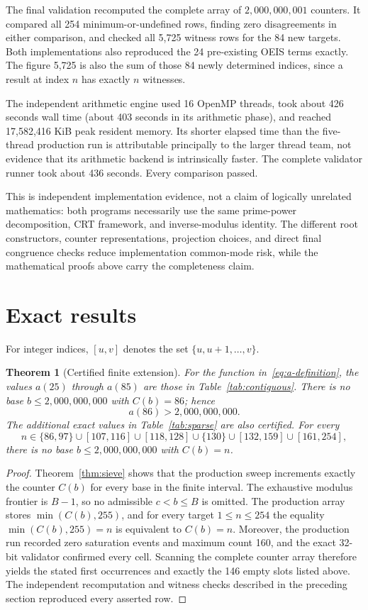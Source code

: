 \documentclass[11pt]{article}
\newtheorem{theorem}{Theorem}
\begin{document}
The final validation recomputed the complete array of
$2{,}000{,}000{,}001$ counters.  It compared all 254 minimum-or-undefined
rows, finding zero disagreements in either comparison, and checked all 5,725
witness rows for the 84 new targets.  Both implementations also reproduced
the 24 pre-existing OEIS terms exactly.
The figure 5,725 is also the sum of those 84 newly determined indices, since
a result at index $n$ has exactly $n$ witnesses.

The independent arithmetic engine used 16 OpenMP threads, took about 426 seconds wall time (about 403 seconds in its arithmetic phase), and reached 17,582,416 KiB peak resident memory.  Its shorter elapsed time than the five-thread production run is attributable principally to the larger thread team, not evidence that its arithmetic backend is intrinsically faster.
The complete validator runner took about 436 seconds.  Every comparison passed.

This is independent implementation evidence, not a claim of logically
unrelated mathematics: both programs necessarily use the same prime-power
decomposition, CRT framework, and inverse-modulus identity.  The different
root constructors, counter representations, projection choices, and direct
final congruence checks reduce implementation common-mode risk, while the
mathematical proofs above carry the completeness claim.

\section{Exact results}

For integer indices, $[u,v]$ denotes the set
$\{u,u+1,\ldots,v\}$.

\begin{theorem}[Certified finite extension]\label{thm:result}
For the function in~\eqref{eq:a-definition}, the values $a(25)$ through
$a(85)$ are those in Table~\ref{tab:contiguous}.  There is no base
$b\leq2{,}000{,}000{,}000$ with $C(b)=86$; hence
\[
 a(86)>2{,}000{,}000{,}000.
\]
The additional exact values in Table~\ref{tab:sparse} are also certified.
For every
\[
 n\in\{86,97\}\cup[107,116]\cup[118,128]\cup\{130\}
       \cup[132,159]\cup[161,254],
\]
there is no base $b\leq2{,}000{,}000{,}000$ with $C(b)=n$.
\end{theorem}

\begin{proof}
Theorem~\ref{thm:sieve} shows that the production sweep increments exactly
the counter $C(b)$ for every base in the finite interval.  The exhaustive
modulus frontier is $B-1$, so no admissible $c<b\leq B$ is omitted.  The
production array stores $\min(C(b),255)$, and for every target
$1\leq n\leq254$ the equality $\min(C(b),255)=n$ is equivalent to $C(b)=n$.
Moreover, the production run recorded zero saturation events and maximum
count 160, and the exact 32-bit validator confirmed every cell.  Scanning the
complete counter array therefore yields the stated first occurrences and
exactly the 146 empty slots listed above.  The independent recomputation and
witness checks described in the preceding section reproduced every asserted
row.
\end{proof}
\end{document}
